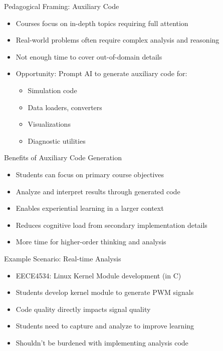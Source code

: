 \documentclass[xcolor=dvipsnames, aspectratio=169]{beamer}
\begin{document}
\begin{frame}{Pedagogical Framing: Auxiliary Code}
  \begin{itemize}
    \item Courses focus on in-depth topics requiring full attention
    \item Real-world problems often require complex analysis and reasoning
    \item Not enough time to cover out-of-domain details
    \item Opportunity: Prompt AI to generate auxiliary code for:
      \begin{itemize}
        \item Simulation code
        \item Data loaders, converters
        \item Visualizations
        \item Diagnostic utilities
      \end{itemize}
  \end{itemize}
\end{frame}

\begin{frame}{Benefits of Auxiliary Code Generation}
  \begin{itemize}
    \item Students can focus on primary course objectives
    \item Analyze and interpret results through generated code
    \item Enables experiential learning in a larger context
    \item Reduces cognitive load from secondary implementation details
    \item More time for higher-order thinking and analysis
  \end{itemize}
\end{frame}

\begin{frame}{Example Scenario: Real-time Analysis}
  \begin{itemize}
    \item EECE4534: Linux Kernel Module development (in C)
    \item Students develop kernel module to generate PWM signals
    \item Code quality directly impacts signal quality
    \item Students need to capture and analyze to improve learning
    \item Shouldn't be burdened with implementing analysis code
  \end{itemize}
\end{frame}
\end{document}
